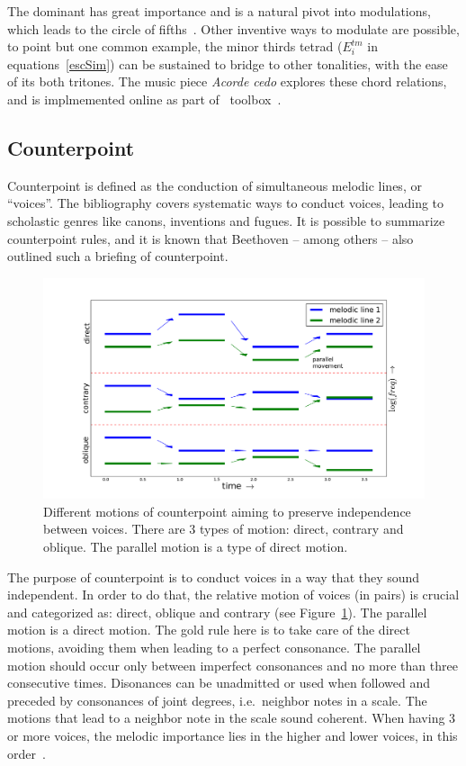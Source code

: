 The dominant has great importance and is a natural pivot into modulations,
which leads to the circle of fifths~\cite{Harmonia,Salzer,Koellheuteur,Harmony}.
Other inventive ways to modulate are possible, to point but one common example, the minor thirds tetrad ($E_i^{tm}$ in equations~\ref{escSim}) can be sustained to bridge to other tonalities, with the ease of its both tritones.
The music piece \emph{Acorde cedo} explores these chord relations, and is implmemented online as part of \massa\ toolbox~\cite{MASSA}.


\subsection{Counterpoint}\label{subsec:contraponto}

Counterpoint is defined as the conduction of simultaneous melodic lines, or ``voices''. The bibliography covers systematic ways to conduct voices, leading to scholastic genres like canons, inventions and fugues. It is possible to
summarize counterpoint rules, and it is known that Beethoven --
among others -- also outlined such a briefing of counterpoint.

\begin{figure}[h!]
    \centering
        \includegraphics[width=\columnwidth]{figures/movContraponto}
    \caption{Different motions of counterpoint aiming to preserve independence
        between voices. There are 3 types of motion: direct, contrary and
        oblique. The parallel motion is a type of direct motion.}
        \label{fig:movContraponto}
\end{figure}

The purpose of counterpoint is to conduct voices in a way that they sound independent. In order to do that, the relative motion of voices (in pairs) is crucial and
categorized as: direct, oblique and contrary (see Figure~\ref{fig:movContraponto}).
The parallel motion is a direct motion.
The gold rule here is to take care of the direct motions, avoiding them
when leading to a perfect consonance. The parallel motion should occur only between
imperfect consonances and no more than three consecutive times. Disonances can be unadmitted or used when followed and preceded by consonances of joint
degrees, i.e.\ neighbor notes in a scale. The motions that lead to a
neighbor note in the scale sound coherent. When having 3 or more voices, the melodic
importance lies in the higher and lower voices, in this order~\cite{Fux,Tragtenberg,SchoenbergContra}.

